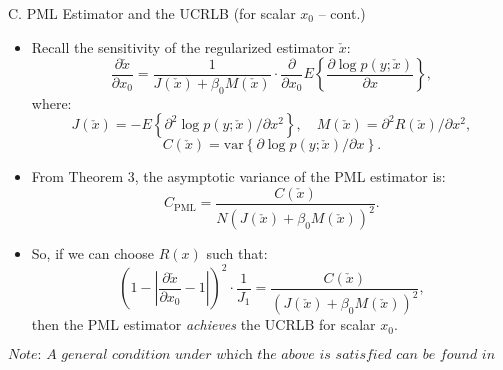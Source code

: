\documentclass{beamer}
\begin{document}
\begin{frame}{C. PML Estimator and the UCRLB (for scalar $x_0$ -- cont.)}

\begin{itemize}
    \item Recall the sensitivity of the regularized estimator $\check{x}$:
    \begin{equation*}
        \frac{\partial \check{x}}{\partial x_0} = \frac{1}{J(\check{x}) + \beta_0 M(\check{x})} \cdot \frac{\partial}{\partial x_0} E \left\{ \frac{\partial \log p(y; \check{x})}{\partial x} \right\},
    \end{equation*}
    where:
    \[
    J(\check{x}) = -E \left\{ \partial^2 \log p(y; \check{x}) / \partial x^2 \right\}, \quad
    M(\check{x}) = \partial^2 R(\check{x}) / \partial x^2,
    \]
    \[
    C(\check{x}) = \text{var} \left\{ \partial \log p(y; \check{x}) / \partial x \right\}.
    \]

    \item From Theorem 3, the asymptotic variance of the PML estimator is:
    \begin{equation*}
        C_{\text{PML}} = \frac{C(\check{x})}{N(J(\check{x}) + \beta_0 M(\check{x}))^2}.
    \end{equation*}

    \item So, if we can choose $R(x)$ such that:
    \begin{equation*}
        \left(1 - \left| \frac{\partial \check{x}}{\partial x_0} - 1 \right| \right)^2 \cdot \frac{1}{J_1}
        = \frac{C(\check{x})}{(J(\check{x}) + \beta_0 M(\check{x}))^2},
    \end{equation*}
    then the PML estimator \textit{achieves} the UCRLB for scalar $x_0$.
    
\end{itemize}

\vspace{-25pt}

$$\scriptstyle \textit{Note: A general condition under which the above is satisfied can be found in Appendix B.}$$

\end{frame}
\end{document}
